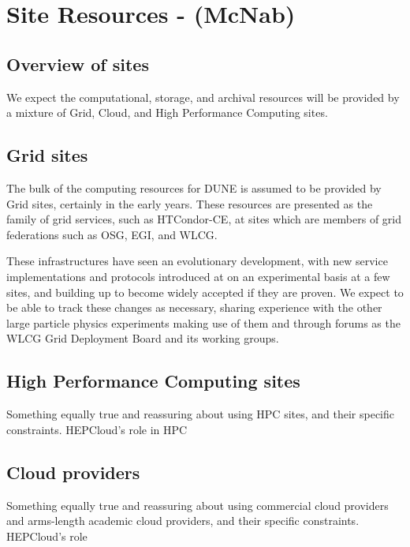 \chapter{Site Resources - (McNab)}
\label{ch:sites}


\section{Overview of sites}
\label{sec:sites:overview}

We expect the computational, storage, and archival resources will be provided by a mixture of Grid, Cloud, and High Performance Computing sites. 

\section{Grid sites}
\label{sec:sites:grid}  %

The bulk of the computing resources for DUNE is assumed to be provided by Grid sites, certainly in the early years. These resources are presented as the family of grid services, such as HTCondor-CE, at sites which are members of grid federations such as OSG, EGI, and WLCG.

These infrastructures have seen an evolutionary development, with new service implementations and protocols introduced at on an experimental basis at a few sites, and building up to become widely accepted if they are proven. We expect to be able to track these changes as necessary, sharing experience with the other large particle physics experiments making use of them and through forums as the WLCG Grid Deployment Board and its working groups.

\section{High Performance Computing sites}
\label{sec:sites:hpc}

Something equally true and reassuring about using HPC sites, and their specific constraints. HEPCloud's role in HPC

\section{Cloud providers}
\label{sec:sites:cloud}

Something equally true and reassuring about using commercial cloud providers and arms-length academic cloud providers, and their specific constraints. HEPCloud's role
